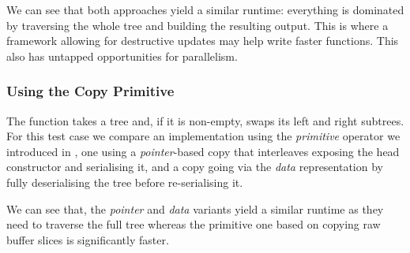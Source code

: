 We can see that both approaches yield a similar runtime: everything is
dominated by traversing the whole tree and building the resulting output.
%
This is where a framework allowing for destructive updates may help
write faster functions.
%
This also has untapped opportunities for parallelism.

\subsubsection{Using the Copy Primitive}

The  function takes a tree and, if it is non-empty,
swaps its left and right subtrees.
%
For this test case we compare an implementation using the
\emph{primitive}  operator we introduced in ,
one using a \emph{pointer}-based copy that interleaves exposing the head
constructor and serialising it,
and a copy going via the \emph{data} representation by fully deserialising
the tree before re-serialising it.

\noindent
\begin{minipage}{.5\textwidth}
\end{minipage}\hfill
\begin{minipage}{.45\textwidth}
\end{minipage}

We can see that, the \emph{pointer} and \emph{data} variants yield a similar
runtime as they need to traverse the full tree whereas the primitive
one based on copying raw buffer slices is significantly faster.
